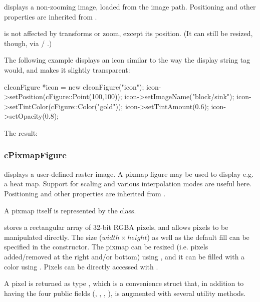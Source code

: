  displays a non-zooming image, loaded from the {\opp}
image path. Positioning and other properties are inherited from
.

 is not affected by transforms or zoom, except its position.
(It can still be resized, though, via  / .)

The following example displays an icon similar to the way the
 display string tag would, and makes
it slightly transparent:

\begin{cpp}
cIconFigure *icon = new cIconFigure("icon");
icon->setPosition(cFigure::Point(100,100));
icon->setImageName("block/sink");
icon->setTintColor(cFigure::Color("gold"));
icon->setTintAmount(0.6);
icon->setOpacity(0.8);
\end{cpp}


The result:

\begin{center}
\end{center}


\subsubsection{cPixmapFigure}
\label{sec:graphics:pixmapfigure}

 displays a user-defined raster image. A pixmap
figure may be used to display e.g. a heat map. Support for scaling and
various interpolation modes are useful here. Positioning and other
properties are inherited from .

A pixmap itself is represented by the  class.

 stores a rectangular array of 32-bit RGBA pixels,
and allows pixels to be manipulated directly. The size ($width \times
height$) as well as the default fill can be specified in the constructor.
The pixmap can be resized (i.e. pixels added/removed at the right and/or bottom)
using , and it can be filled with a color using .
Pixels can be directly accessed with .

A pixel is returned as type , which is a convenience
struct that, in addition to having the four public  fields
(, , , ), is augmented with several
utility methods.

